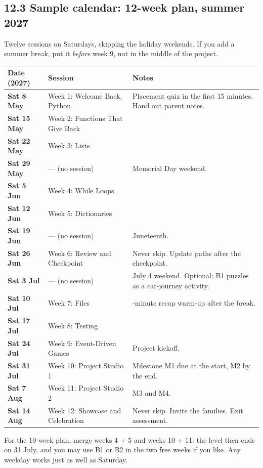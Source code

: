 \documentclass[level=2,teacher]{kidscode}
\begin{document}
\subsection{12.3 Sample calendar: 12-week plan, summer 2027}
Twelve sessions on Saturdays, skipping the holiday weekends. If you add a summer break, put it
\emph{before} week 9, not in the middle of the project.

{\small
\begin{longtable}{@{}>{\bfseries}p{2.6cm}>{\raggedright\arraybackslash}p{4.8cm}>{\raggedright\arraybackslash}p{7.0cm}@{}}
\toprule
Date (2027) & Session & Notes \\ \midrule\endhead
Sat 8 May & Week 1: Welcome Back, Python & Placement quiz in the first 15 minutes. Hand out parent notes. \\
Sat 15 May & Week 2: Functions That Give Back & \\
Sat 22 May & Week 3: Lists & \\
Sat 29 May & --- (no session) & Memorial Day weekend. \\
Sat 5 Jun & Week 4: While Loops & \\
Sat 12 Jun & Week 5: Dictionaries & \\
Sat 19 Jun & --- (no session) & Juneteenth. \\
Sat 26 Jun & Week 6: Review and Checkpoint & Never skip. Update paths after the checkpoint. \\
Sat 3 Jul & --- (no session) & July 4 weekend. Optional: B1 puzzles as a car-journey activity. \\
Sat 10 Jul & Week 7: Files & 10-minute recap warm-up after the break. \\
Sat 17 Jul & Week 8: Testing & \\
Sat 24 Jul & Week 9: Event-Driven Games & Project kickoff. \\
Sat 31 Jul & Week 10: Project Studio 1 & Milestone M1 due at the start, M2 by the end. \\
Sat 7 Aug & Week 11: Project Studio 2 & M3 and M4. \\
Sat 14 Aug & Week 12: Showcase and Celebration & Never skip. Invite the families. Exit assessment. \\
\bottomrule
\end{longtable}}

\begin{teachernote}
For the 10-week plan, merge weeks 4 + 5 and weeks 10 + 11: the level then ends on 31 July, and you may
use B1 or B2 in the two free weeks if you like. Any weekday works just as well as Saturday.
\end{teachernote}
\end{document}
